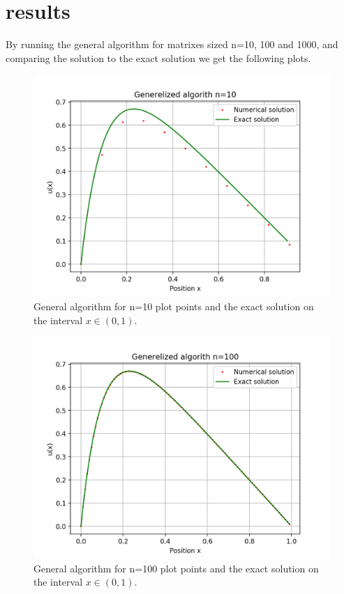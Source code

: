 \documentclass[10pt]{article}
\begin{document}
\section{results}

By running the general algorithm for matrixes sized n=10, 100 and 1000, and comparing the solution to the exact solution we get the following plots.

\begin{figure}[H]
  \center
  \includegraphics[scale=0.5]{alg-0-n10plot.png}
  \caption{General algorithm for n=10 plot points and the exact solution on the interval $x\in (0,1)$.}
  \label{fig:plotn10}
\end{figure}
\begin{figure}[H]
  \center
  \includegraphics[scale=0.5]{alg-0-n100plot.png}  \caption{General algorithm for n=100 plot points and the exact solution on the interval $x\in (0,1)$.}
  \label{fig:plotn100}
\end{figure}
\end{document}

